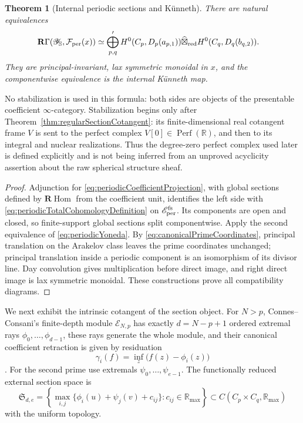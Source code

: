 \documentclass[11pt]{amsart}
\newtheorem{theorem}{Theorem}[section]
\theoremstyle{definition}
\theoremstyle{remark}
\newcommand{\R}{\mathbb R}
\begin{document}
\begin{theorem}[Internal periodic sections and K\"unneth]
\label{thm:intrinsicPeriodicKunneth}
There are natural equivalences
\begin{align}\label{eq:intrinsicPeriodicSections}
 \mathbf R\Gamma(\mathscr Y_{\mathbb S},\mathcal F_{\rm per}(x))
 &\simeq
 \bigoplus_{p,q}'
 H^0(C_p,D_p(a_{p,1}))
 \widehat\boxtimes_{\rm red}
 H^0(C_q,D_q(b_{q,2})).
\end{align}
They are principal-invariant, lax symmetric monoidal in $x$, and the
componentwise equivalence is the internal K\"unneth map.
\end{theorem}

No stabilization is used in this formula: both sides are objects of the
presentable coefficient $\infty$-category.  Stabilization begins only after
Theorem~\ref{thm:regularSectionCotangent}: its finite-dimensional real
cotangent frame $V$ is sent to the perfect complex $V[0]\in\operatorname{Perf}(\R)$,
and then to its integral and nuclear realizations.  Thus the degree-zero
perfect complex used later is defined explicitly and is not being inferred
from an unproved acyclicity assertion about the raw spherical structure
sheaf.

\begin{proof}
Adjunction for \eqref{eq:periodicCoefficientProjection}, with global
sections defined by $\mathbf R\!\operatorname{Hom}$ from the coefficient
unit, identifies the left side with
\eqref{eq:periodicTotalCohomologyDefinition} on $\mathscr E_{\rm per}^{\rm fs}$.
Its components are
open and closed, so finite-support global sections split componentwise.
Apply the second equivalence of \eqref{eq:periodicYoneda}.  By
\eqref{eq:canonicalPrimeCoordinates}, principal translation on the
Arakelov class leaves the prime coordinates unchanged; principal
translation inside a periodic component is an isomorphism of its divisor
line.  Day convolution
gives multiplication before direct image, and right direct image is lax
symmetric monoidal.  These constructions prove all compatibility diagrams.
\end{proof}

We next exhibit the intrinsic cotangent of the section object.  For $N>p$,
Connes--Consani's finite-depth module $\mathcal E_{N,p}$ has exactly
$d=N-p+1$ ordered extremal rays $\phi_0,\ldots,\phi_{d-1}$, these rays
generate the whole module, and their canonical coefficient retraction is
given by residuation
\begin{equation}\label{eq:periodicResiduation}
 \gamma_i(f)=\inf_z\bigl(f(z)-\phi_i(z)\bigr)
\end{equation}
\cite[Lemma~5.19, Appendix~A, Proposition~A.2 and Lemma~A.3]
{CC-ScalingSite}.  For the second prime use extremals
$\psi_0,\ldots,\psi_{e-1}$.  The functionally reduced external section
space is
\begin{equation}\label{eq:actualMixedSectionModuli}
 \mathfrak S_{d,e}
 =\left\{
  \max_{i,j}\{\phi_i(u)+\psi_j(v)+c_{ij}\}:c_{ij}\in\R_{\max}
  \right\}
 \subset C(C_p\times C_q,\R_{\max})
\end{equation}
with the uniform topology.
\end{document}
